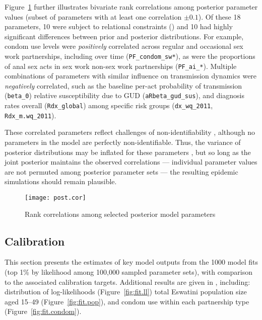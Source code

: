 \par
Figure~\ref{fig:post.cor} further illustrates bivariate rank correlations among
posterior parameter values (subset of parameters with at least one correlation $\pm 0.1$).
Of these 18 parameters, 10 were subject to relational constraints ()
and 10 had highly significant differences between prior and posterior distributions.
For example, condom use levels were \emph{positively} correlated across
regular and occasional sex work partnerships, including over time (\texttt{PF_condom_sw*}), as were
the proportions of anal sex acts in sex work \vs non-sex work partnerships (\texttt{PF_ai_*}).
Multiple combinations of parameters with similar influence on transmission dynamics
were \emph{negatively} correlated, such as
the baseline per-act probability of transmission (\texttt{beta_0}) \vs
relative susceptibility due to GUD (\texttt{aRbeta_gud_sus}), and
diagnosis rates overall (\texttt{Rdx_global}) \vs
among specific risk groups (\texttt{dx_wq_2011}, \texttt{Rdx_m.wq_2011}).
\par
These correlated parameters reflect challenges of non-identifiability \cite{Raue2009},
although no parameters in the model are perfectly non-identifiable.
Thus, the variance of posterior distributions may be inflated for these parameters \cite{Raue2009},
but so long as the joint posterior maintains the observed correlations
--- \ie individual parameter values are not permuted among posterior parameter sets ---
the resulting epidemic simulations should remain plausible.
\begin{figure}
  \centering\texttt{[image: post.cor]}
  \caption{Rank correlations among selected posterior model parameters}
  \label{fig:post.cor}
\end{figure}
\subsection{Calibration}\label{model.res.cal}
This section presents the estimates of key model outputs
from the 1000 model fits (top 1\% by likelihood among 100,000 sampled parameter sets),
with comparison to the associated calibration targets.
Additional results are given in , including:
distribution of log-likelihoods (Figure~\ref{fig:fit.ll})
total Eswatini population size aged 15--49 (Figure~\ref{fig:fit.pop}),
and condom use within each partnership type (Figure~\ref{fig:fit.condom}).
